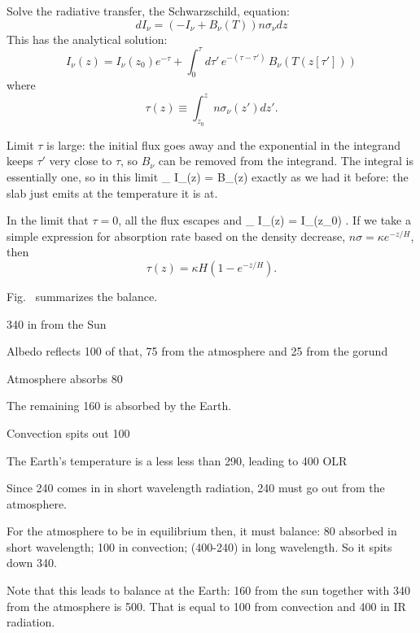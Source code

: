 \documentclass[11pt]{book}
\begin{document}
 
 Solve the radiative transfer, the Schwarzschild, equation:
$$ dI_\nu = (-I_\nu + B_\nu(T)) n\sigma_\nu dz $$
This has the analytical solution:
$$ I_\nu(z) = I_\nu(z_0) e^{-\tau} + \int_{0}^\tau d\tau'\,e^{-(\tau-\tau')}\, B_\nu\left(T(z[\tau'])\right)$$
where $$\tau(z)\equiv \int_{z_0}^z  n\sigma_\nu(z') dz'.$$
\bei
\item Limit $\tau$ is large: the initial flux goes away and the exponential in the integrand keeps $\tau'$ very close to $\tau$, so $B_\nu$ can be removed from the integrand. The integral is essentially one, so in this limit
\be
\lim_{\tau\rightarrow\infty} I_\nu(z) = B_\nu(z)
\ee
exactly as we had it before: the slab just emits at the temperature it is at.
\item In the limit that $\tau=0$, all the flux escapes and 
\be
\lim_{\tau{}} I_\nu(z) = I_\nu(z_0)
.\ee
\eei
If we take a simple expression for absorption rate based on the density decrease, $n\sigma=\kappa e^{-z/H}$, then
$$ \tau(z) = \kappa H \left( 1- e^{-z/H}\right).$$



Fig.~ summarizes the balance.  
\bei
\item 340 in from the Sun
\item Albedo reflects 100 of that, 75 from the atmosphere and 25 from the gorund
\item Atmosphere absorbs 80
\item The remaining 160 is absorbed by the Earth.
\item Convection spits out 100
\item The Earth's temperature is a less less than 290, leading to 400 OLR
\item Since 240 comes in in short wavelength radiation, 240 must go out from the atmosphere. 
\item For the atmosphere to be in equilibrium then, it must balance: 80 absorbed in short wavelength; 100 in convection; (400-240) in long wavelength. So it spits down 340.
\item Note that this leads to balance at the Earth: 160 from the sun together with 340 from the atmosphere is 500. That is equal to 100 from convection and 400 in IR radiation.
\eei

\end{document}
